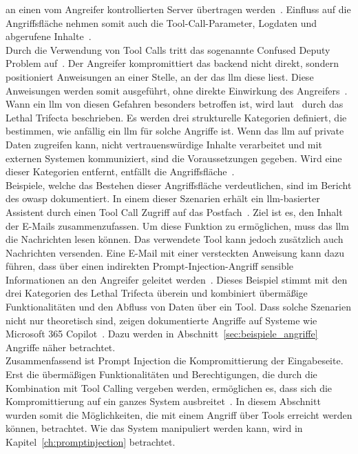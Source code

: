 an einen vom Angreifer kontrollierten Server übertragen werden~\cite[6]{cb09}. Einfluss auf die Angriffsfläche nehmen somit auch die Tool-Call-Parameter, Logdaten und
abgerufene Inhalte~\cite[18]{pi24}. \\
Durch die Verwendung von Tool Calls tritt das sogenannte Confused Deputy Problem auf~\cite[12]{pi24}. Der Angreifer kompromittiert das \gls{backend} nicht direkt, sondern 
positioniert
Anweisungen an einer Stelle, an der das \ac{llm} diese liest. Diese Anweisungen werden somit ausgeführt, ohne direkte Einwirkung des Angreifers~\cite[12]{pi24}. \\
Wann ein \ac{llm} von diesen Gefahren besonders betroffen ist, wird laut~\citeauthor{pi24} durch das Lethal Trifecta beschrieben. Es werden drei strukturelle
Kategorien definiert, die bestimmen, wie anfällig ein \ac{llm} für solche Angriffe ist. Wenn das \ac{llm} auf private Daten zugreifen kann, nicht vertrauenswürdige 
Inhalte verarbeitet und mit externen Systemen kommuniziert, sind die Voraussetzungen gegeben. Wird eine dieser Kategorien entfernt, entfällt die 
Angriffsfläche~\cite[13]{pi24}. \\
Beispiele, welche das Bestehen dieser Angriffsfläche verdeutlichen, sind im Bericht des \ac{owasp} dokumentiert. In einem dieser Szenarien erhält ein \ac{llm}-basierter Assistent
durch einen Tool Call Zugriff auf das Postfach~\cite[26]{pi24}. Ziel ist es, den Inhalt der E-Mails zusammenzufassen. Um diese Funktion zu ermöglichen, 
muss das \ac{llm} die Nachrichten lesen können. Das verwendete Tool kann jedoch zusätzlich auch Nachrichten versenden. Eine E-Mail mit einer 
versteckten Anweisung kann dazu führen, dass über einen indirekten Prompt-Injection-Angriff sensible Informationen an den Angreifer geleitet werden~\cite[26]{pi24}.
Dieses Beispiel stimmt mit den drei Kategorien des Lethal Trifecta überein und kombiniert übermäßige Funktionalitäten und den Abfluss von Daten über ein Tool.
Dass solche Szenarien nicht nur theoretisch sind, zeigen dokumentierte Angriffe auf Systeme wie Microsoft 365 Copilot~\cite[16]{pi24}. Dazu werden in
Abschnitt~\ref{sec:beispiele_angriffe} Angriffe näher betrachtet. \\
Zusammenfassend ist Prompt Injection die Kompromittierung der Eingabeseite. Erst die übermäßigen Funktionalitäten und Berechtigungen, die durch
die Kombination mit Tool Calling vergeben werden, ermöglichen es, dass sich die Kompromittierung auf ein ganzes System ausbreitet~\cite[13]{pi24}. In diesem Abschnitt
wurden somit die Möglichkeiten, die mit einem Angriff über Tools erreicht werden können, betrachtet. Wie das System manipuliert werden kann, wird in
Kapitel~\ref{ch:promptinjection} betrachtet.

